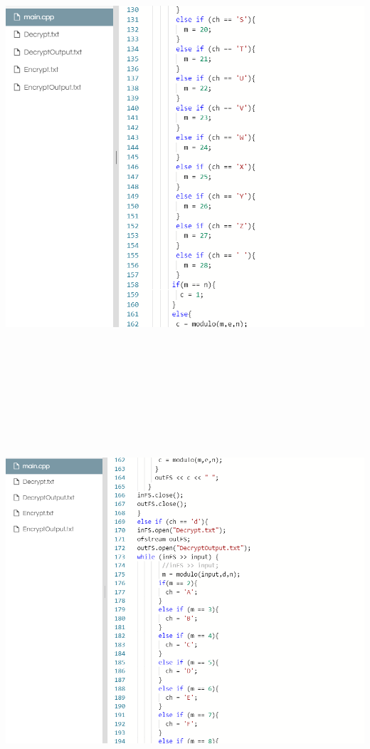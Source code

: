 \documentclass{article}
\begin{document}
\begin{solution}
\includegraphics[width=16cm, height=16cm]{5a.png}\\
\includegraphics[width=16cm, height=16cm]{6a.png}\\

\end{solution}
\end{document}
